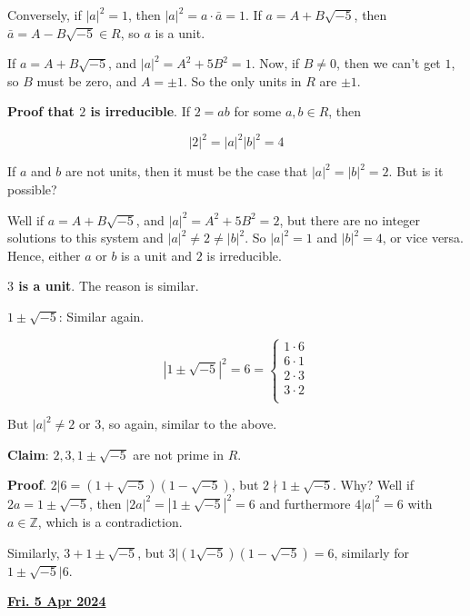 \documentclass[12pt]{article}
\renewcommand{\date}[1]{\underline{\bf #1}}
\def\Z{{\mathbb Z}}
\theoremstyle{remark}
\theoremstyle{remark}
\theoremstyle{remark}
\theoremstyle{remark}
\theoremstyle{remark}
\begin{document}
Conversely, if $|a|^2 = 1$, then $|a|^2 = a \cdot \bar a = 1$. If $a = A +
B\sqrt{-5}$, then $\bar a = A - B\sqrt{-5} \in R$, so $a$ is a unit.


If $a = A + B \sqrt{-5}$, and $|a|^2 = A^2 + 5B^2 = 1$. Now, if $B \ne 0$, then
we can't get $1$, so $B$ must be zero, and $A = \pm 1$. So the only units in $R$
are $\pm 1$.

{\bf Proof that $2$ is irreducible}. If $2 = ab$ for some $a, b \in R$, then

\[
  |2|^2 = |a|^2 |b|^2 = 4
\]

If $a$ and $b$ are not units, then it must be the case that $|a|^2 = |b|^2 =
2$. But is it possible?

Well if $a = A + B \sqrt{-5}$, and $|a|^2 = A^2 + 5B^2 = 2$, but there are no
integer solutions to this system and $|a|^2 \ne 2 \ne |b|^2$. So $|a|^2 = 1$ and
$|b|^2 = 4$, or vice versa. Hence, either $a$ or $b$ is a unit and $2$ is
irreducible.

{\bf $3$ is a unit}. The reason is similar.

{\bf $1 \pm \sqrt{-5}$}: Similar again.

\[
  |1 \pm \sqrt{-5}|^2 = 6 = \begin{cases}
    1 \cdot 6 \\
    6 \cdot 1 \\
    2 \cdot 3 \\
    3 \cdot 2 \\
  \end{cases}
\]

But $|a|^2 \ne 2$ or $3$, so again, similar to the above.

{\bf Claim}: $2, 3, 1 \pm \sqrt{-5}$ are not prime in $R$.

{\bf Proof}. $2 | 6 = (1 + \sqrt{-5})(1 - \sqrt{-5})$, but $2 \nmid 1 \pm
\sqrt{-5}$. Why? Well if $2a = 1 \pm \sqrt{-5}$, then $|2a|^2 = |1 \pm
\sqrt{-5}|^2 = 6$ and furthermore $4|a|^2 = 6$ with $a \in \Z$, which is a
contradiction.

Similarly, $3 + 1 \pm \sqrt{-5}$, but $3 | (1 \sqrt{-5})(1 - \sqrt{-5}) = 6$,
similarly for $1 \pm \sqrt{-5} | 6$.

\date{Fri. 5 Apr 2024}
\end{document}
